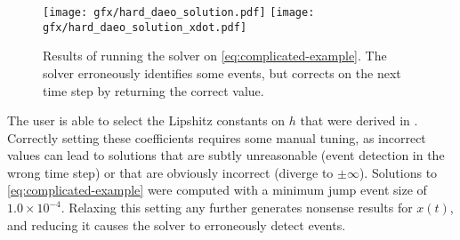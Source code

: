 \documentclass[twoside,leqno, twocolumn]{article}
\begin{document}
\begin{figure}[h]
	\centering
	\texttt{[image: gfx/hard\_daeo\_solution.pdf]}
	\texttt{[image: gfx/hard\_daeo\_solution\_xdot.pdf]}
	
	\caption{Results of running the solver on \eqref{eq:complicated-example}. The solver erroneously identifies some events, but corrects on the next time step by returning the correct value. }
	\label{fig:complicated-example-solution}
\end{figure}

The user is able to select the Lipshitz constants on $h$ that were derived in \cite{deussenNumericalSimulationDifferentialalgebraic2023}. Correctly setting these coefficients requires some manual tuning, as incorrect values can lead to solutions that are subtly unreasonable (event detection in the wrong time step) or that are obviously incorrect (diverge to $\pm\infty$). Solutions to \eqref{eq:complicated-example} were computed with a minimum jump event size of $1.0\times10^{-4}$. Relaxing this setting any further generates nonsense results for $x(t)$, and reducing it causes the solver to erroneously detect events.

%
%
\end{document}
